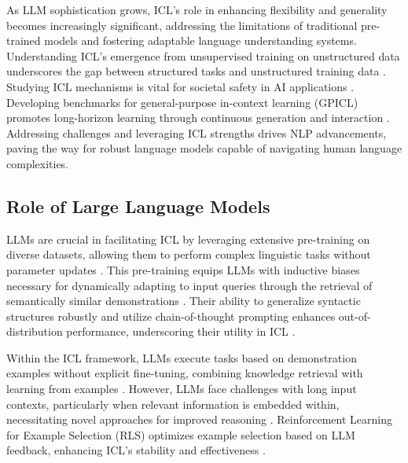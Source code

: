 As LLM sophistication grows, ICL's role in enhancing flexibility and generality becomes increasingly significant, addressing the limitations of traditional pre-trained models and fostering adaptable language understanding systems. Understanding ICL's emergence from unsupervised training on unstructured data underscores the gap between structured tasks and unstructured training data \cite{wibisono2024unstructureddataincontextlearning}. Studying ICL mechanisms is vital for societal safety in AI applications \cite{wang2024understandingknowledgehijackmechanism}. Developing benchmarks for general-purpose in-context learning (GPICL) promotes long-horizon learning through continuous generation and interaction \cite{wang2024benchmarkinggeneralpurposeincontextlearning}. Addressing challenges and leveraging ICL strengths drives NLP advancements, paving the way for robust language models capable of navigating human language complexities.

\subsection{Role of Large Language Models} \label{subsec:Role of Large Language Models}

LLMs are crucial in facilitating ICL by leveraging extensive pre-training on diverse datasets, allowing them to perform complex linguistic tasks without parameter updates \cite{nie2024codestyleincontextlearningknowledgebased}. This pre-training equips LLMs with inductive biases necessary for dynamically adapting to input queries through the retrieval of semantically similar demonstrations \cite{mueller2024incontextlearninggeneralizesrobustly}. Their ability to generalize syntactic structures robustly and utilize chain-of-thought prompting enhances out-of-distribution performance, underscoring their utility in ICL \cite{lai2024unleashingincontextlearningautoregressive}.

Within the ICL framework, LLMs execute tasks based on demonstration examples without explicit fine-tuning, combining knowledge retrieval with learning from examples \cite{chen2023stabilizedincontextlearningpretrained}. However, LLMs face challenges with long input contexts, particularly when relevant information is embedded within, necessitating novel approaches for improved reasoning \cite{du2024incontextlearningreinforcementlearning}. Reinforcement Learning for Example Selection (RLS) optimizes example selection based on LLM feedback, enhancing ICL's stability and effectiveness \cite{wang2024bettersumusingaggregated}.

